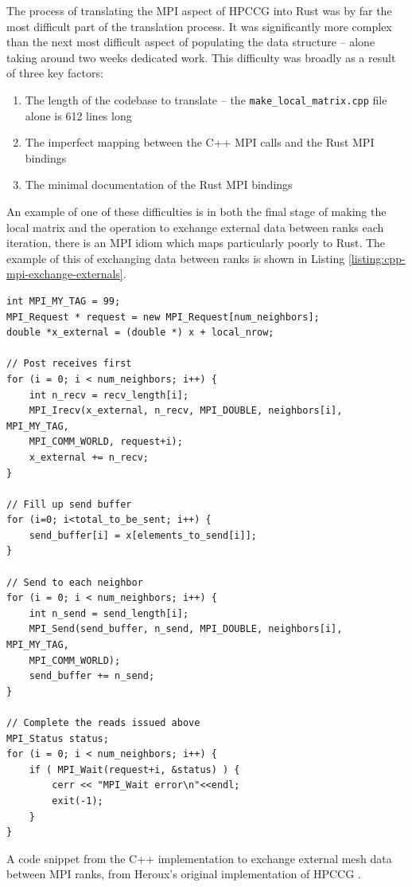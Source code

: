 The process of translating the MPI aspect of HPCCG into Rust was by far the most difficult part of the translation process. It was significantly more complex than the next most difficult aspect of populating the data structure -- alone taking around two weeks dedicated work. This difficulty was broadly as a result of three key factors:

\begin{enumerate}
    \item The length of the codebase to translate -- the \texttt{make\_local\_matrix.cpp} file alone is 612 lines long
    \item The imperfect mapping between the C++ MPI calls and the Rust MPI bindings
    \item The minimal documentation of the Rust MPI bindings
\end{enumerate}

An example of one of these difficulties is in both the final stage of making the local matrix and the operation to exchange external data between ranks each iteration, there is an MPI idiom which maps particularly poorly to Rust.
The example of this of exchanging data between ranks is shown in Listing \ref{listing:cpp-mpi-exchange-externals}.

\begin{code}
    \begin{verbatim}
int MPI_MY_TAG = 99;  
MPI_Request * request = new MPI_Request[num_neighbors];
double *x_external = (double *) x + local_nrow;

// Post receives first 
for (i = 0; i < num_neighbors; i++) {
    int n_recv = recv_length[i];
    MPI_Irecv(x_external, n_recv, MPI_DOUBLE, neighbors[i], MPI_MY_TAG, 
    MPI_COMM_WORLD, request+i);
    x_external += n_recv;
}

// Fill up send buffer
for (i=0; i<total_to_be_sent; i++) {
    send_buffer[i] = x[elements_to_send[i]];
}

// Send to each neighbor
for (i = 0; i < num_neighbors; i++) {
    int n_send = send_length[i];
    MPI_Send(send_buffer, n_send, MPI_DOUBLE, neighbors[i], MPI_MY_TAG, 
    MPI_COMM_WORLD);
    send_buffer += n_send;
}

// Complete the reads issued above
MPI_Status status;
for (i = 0; i < num_neighbors; i++) {
    if ( MPI_Wait(request+i, &status) ) {
        cerr << "MPI_Wait error\n"<<endl;
        exit(-1);
    }
}
    \end{verbatim}
    \caption{A code snippet from the C++ implementation to exchange external mesh data between MPI ranks, from Heroux's original implementation of HPCCG \cite{MantevoHPCCG2023}.}
    \label{listing:cpp-mpi-exchange-externals}
\end{code}

